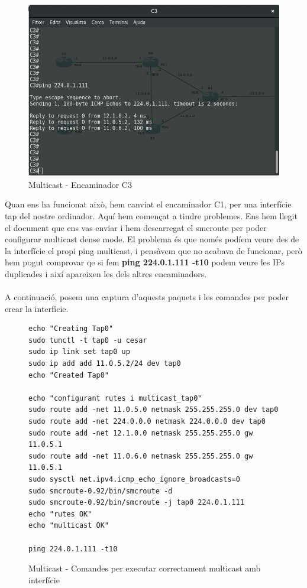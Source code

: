 \documentclass[10pt]{article}
\begin{document}
\begin{figure}[H]
\begin{center}
\includegraphics[scale=0.34]{Images/1aPartC3.png}
\caption{Multicast - Encaminador C3}
\end{center}
\end{figure}
Quan ens ha funcionat això, hem canviat el encaminador C1, per una interfície tap del nostre ordinador. Aquí hem començat a tindre problemes. Ens hem llegit el document que ens vas enviar i hem descarregat el smcroute per poder configurar multicast dense mode. El problema és que només podíem veure des de la interfície el propi ping multicast, i pensàvem que no acabava de funcionar, però hem pogut comprovar qe si fem \textbf{ping 224.0.1.111 -t10} podem veure les IPs duplicades i així apareixen les dels altres encaminadors.
\\\\
A continuació, posem una captura d'aquests paquets i les comandes per poder crear la interfície.
\begin{figure}[H]
\begin{lstlisting}[style=C]
echo "Creating Tap0"
sudo tunctl -t tap0 -u cesar
sudo ip link set tap0 up
sudo ip add add 11.0.5.2/24 dev tap0
echo "Created Tap0"

echo "configurant rutes i multicast_tap0"
sudo route add -net 11.0.5.0 netmask 255.255.255.0 dev tap0 
sudo route add -net 224.0.0.0 netmask 224.0.0.0 dev tap0
sudo route add -net 12.1.0.0 netmask 255.255.255.0 gw 11.0.5.1
sudo route add -net 11.0.6.0 netmask 255.255.255.0 gw 11.0.5.1
sudo sysctl net.ipv4.icmp_echo_ignore_broadcasts=0
sudo smcroute-0.92/bin/smcroute -d
sudo smcroute-0.92/bin/smcroute -j tap0 224.0.1.111
echo "rutes OK" 
echo "multicast OK"

ping 224.0.1.111 -t10
\end{lstlisting}
\caption{Multicast - Comandes per executar correctament multicast amb interfície}
\end{figure}
\end{document}

